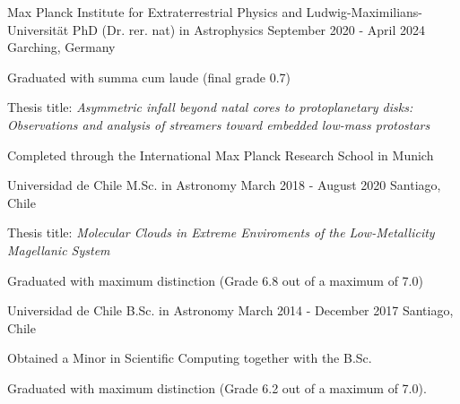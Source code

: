 

\begin{cventries}

 \cventry
    {Max Planck Institute for Extraterrestrial Physics and Ludwig-Maximilians-Universit\"at} %
    {PhD (Dr. rer. nat) in Astrophysics} %
    {September 2020 - April 2024} %
    {Garching, Germany} %
    { \begin{cvitems} %
      \item{Graduated with summa cum laude (final grade 0.7)}
      \item{Thesis title: \textit{Asymmetric infall beyond natal cores to protoplanetary disks: Observations and analysis of streamers toward embedded low-mass protostars}}
      \item{Completed through the International Max Planck Research School in Munich}
      \end{cvitems}
      }


 \cventry
    {Universidad de Chile} %
    {M.Sc. in Astronomy} %
    {March 2018 - August 2020} %
    {Santiago, Chile} %
    {\begin{cvitems} %
    		\item {Thesis title: \textit{Molecular Clouds in Extreme Enviroments of the Low-Metallicity Magellanic System}}
    		\item {Graduated with maximum distinction (Grade 6.8 out of a maximum of 7.0)}
    	\end{cvitems} }
    

  \cventry
    {Universidad de Chile} %
    {B.Sc. in Astronomy} %
    {March 2014 - December 2017} %
     {Santiago, Chile} %
    {
      \begin{cvitems} %
      \item{Obtained a Minor in Scientific Computing together with the B.Sc.}
       \item {Graduated with maximum distinction (Grade 6.2 out of a maximum of 7.0).}
      \end{cvitems}
    }

\end{cventries}
